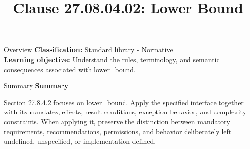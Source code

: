 \documentclass[10pt,letterpaper]{article}
\title{Clause 27.08.04.02: Lower Bound}
\author{}
\date{}
\begin{document}
\maketitle
\begin{CornellOverviewBox}{Overview}
\textbf{Classification:} Standard library - Normative\\[2pt]
\textbf{Learning objective:} Understand the rules, terminology, and semantic consequences associated with lower\_bound.
\end{CornellOverviewBox}\begin{CornellSummaryBox}{Summary}
{\sffamily\bfseries\color{Accent} Summary}\par\vspace{3pt}Section 27.8.4.2 focuses on lower\_bound. Apply the specified interface together with its mandates, effects, result conditions, exception behavior, and complexity constraints. When applying it, preserve the distinction between mandatory requirements, recommendations, permissions, and behavior deliberately left undefined, unspecified, or implementation-defined.
\end{CornellSummaryBox}
\end{document}
